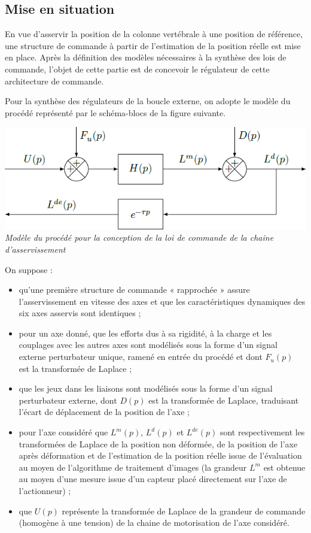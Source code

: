 \setcounter{exo}{0}
\begin{multicols}{2}
\section*{Mise en situation}
\begin{obj}
En vue d’asservir la position de la colonne vertébrale à une position de référence, une structure de
commande à partir de l’estimation de la position réelle est mise en place. Après la définition des
modèles nécessaires à la synthèse des lois de commande, l’objet de cette partie est de concevoir le
régulateur de cette architecture de commande.

\end{obj}


Pour la synthèse des régulateurs de la boucle externe, on adopte le modèle du procédé représenté par le schéma-blocs de la figure suivante. 

\begin{center}
\includegraphics[width=.8\linewidth]{images/fig_02}
\textit{Modèle du procédé pour la conception de la loi de commande
de la chaine d’asservissement}
\end{center}

\ifcolle
\else
On suppose :
\begin{itemize}
\item qu’une première structure de commande « rapprochée » assure l’asservissement en vitesse des axes et que les caractéristiques dynamiques des six axes asservis sont identiques ;
\item pour un axe donné, que les efforts dus à sa rigidité, à la charge et les couplages avec les autres axes sont modélisés sous la forme d’un signal externe perturbateur unique, ramené en entrée du procédé et dont $F_u(p)$ est la transformée de Laplace ;
\item que les jeux dans les liaisons sont modélisés sous la forme d’un signal perturbateur externe, dont $D(p)$ est la transformée de Laplace, traduisant l’écart de déplacement de la position de l’axe ;
\item pour l’axe considéré que $L^m(p)$, $L^d(p)$ et $L^{de}(p)$ sont respectivement les transformées de Laplace de la position non déformée, de la position de l’axe après déformation et de l’estimation de la position réelle issue de l’évaluation au moyen de l’algorithme de traitement d’images (la grandeur $L^m$ est obtenue au moyen d’une mesure issue d’un capteur placé directement sur l’axe de l’actionneur) ;
\item que $U(p)$ représente la transformée de Laplace de la grandeur de commande (homogène à une tension) de la chaine de motorisation de l’axe considéré.
\end{itemize}
\fi



\end{multicols}
